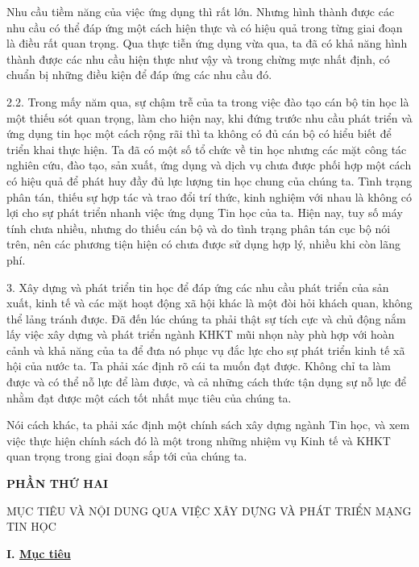 \documentclass[11pt, a4paper, reqno, oneside]{book}
\begin{document}
Nhu cầu tiềm năng của việc ứng dụng thì rất lớn. Nhưng hình thành được các nhu cầu có thể đáp ứng một cách hiện thực và có hiệu quả trong từng giai đoạn là điều rất quan trọng. Qua thực tiễn ứng dụng vừa qua, ta đã có khả năng hình thành được các nhu cầu hiện thực như vậy và trong chừng mực nhất định, có chuẩn bị những điều kiện để đáp ứng các nhu cầu đó.


2.2.	 Trong mấy năm qua, sự chậm trễ của ta trong việc đào tạo cán bộ tin học là một thiếu sót quan trọng, làm cho hiện nay, khi đứng trước nhu cầu phát triển và ứng dụng tin học một cách rộng rãi thì ta không có đủ cán bộ có hiểu biết để triển khai thực hiện. Ta đã có một số tổ chức về tin học nhưng các mặt công tác nghiên cứu, đào tạo, sản xuất, ứng dụng và dịch vụ chưa được phối hợp một cách có hiệu quả để phát huy đầy đủ lực lượng tin học chung của chúng ta. Tình trạng phân tán, thiếu sự hợp tác và trao đổi trí thức, kinh nghiệm với nhau là không có lợi cho sự phát triển nhanh việc ứng dụng Tin học của ta. Hiện nay, tuy số máy tính chưa nhiều, nhưng do thiếu cán bộ và do tình trạng phân tán cục bộ nói trên, nên các phương tiện hiện có chưa được sử dụng hợp lý, nhiều khi còn lãng phí.


3.	Xây dựng và phát triển tin học để đáp ứng các nhu cầu phát triển của sản xuất, kinh tế và các mặt hoạt động xã hội khác là một đòi hỏi khách quan, không thể lảng tránh được. Đã đến lúc chúng ta phải thật sự tích cực và chủ động nắm lấy việc xây dựng và phát triển ngành KHKT mũi nhọn này phù hợp với hoàn cảnh và khả năng của ta để đưa nó phục vụ đắc lực cho sự phát triển kinh tế xã hội của nước ta. Ta phải xác định rõ cái ta muốn đạt được. Không chỉ ta làm được và có thể nỗ lực để làm được, và cả những cách thức tận dụng sự nỗ lực để nhằm đạt được một cách tốt nhất mục tiêu của chúng ta.


Nói cách khác, ta phải xác định một chính sách xây dựng ngành Tin học, và xem việc thực hiện chính sách đó là một trong những nhiệm vụ Kinh tế và KHKT quan trọng trong giai đoạn sắp tới của chúng ta.

\newpage

\begin{center}
\textbf{PHẦN THỨ HAI}
\end{center}


\begin{center}
MỤC TIÊU VÀ NỘI DUNG QUA VIỆC XÂY DỰNG VÀ PHÁT TRIỂN MẠNG TIN HỌC
\end{center}


\textbf{I. \underline{	Mục tiêu}}
\end{document}
